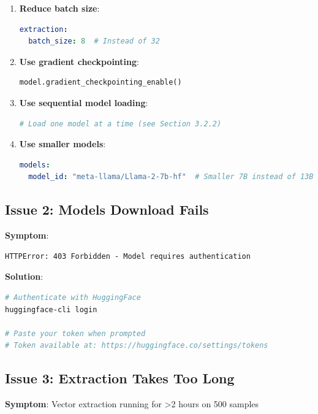 \documentclass[12pt,a4paper,oneside]{report}
\begin{document}
\begin{enumerate}
    \item \textbf{Reduce batch size}:
    \begin{lstlisting}[language=YAML]
extraction:
  batch_size: 8  # Instead of 32
    \end{lstlisting}

    \item \textbf{Use gradient checkpointing}:
    \begin{lstlisting}[language=Python]
model.gradient_checkpointing_enable()
    \end{lstlisting}

    \item \textbf{Use sequential model loading}:
    \begin{lstlisting}[language=Python]
# Load one model at a time (see Section 3.2.2)
    \end{lstlisting}

    \item \textbf{Use smaller models}:
    \begin{lstlisting}[language=YAML]
models:
  model_id: "meta-llama/Llama-2-7b-hf"  # Smaller 7B instead of 13B
    \end{lstlisting}
\end{enumerate}

\subsection{Issue 2: Models Download Fails}

\textbf{Symptom}:
\begin{lstlisting}
HTTPError: 403 Forbidden - Model requires authentication
\end{lstlisting}

\textbf{Solution}:

\begin{lstlisting}[language=Bash]
# Authenticate with HuggingFace
huggingface-cli login

# Paste your token when prompted
# Token available at: https://huggingface.co/settings/tokens
\end{lstlisting}

\subsection{Issue 3: Extraction Takes Too Long}

\textbf{Symptom}: Vector extraction running for >2 hours on 500 samples
\end{document}
